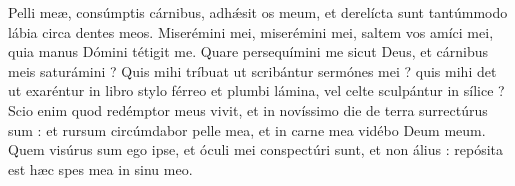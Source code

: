 \lettrine{P}{}elli meæ, consúmptis cárnibus, adhǽsit os meum, et derelícta sunt tantúmmodo lábia circa dentes meos.
Miserémini mei, miserémini mei, saltem vos amíci mei, quia manus Dómini tétigit me.
Quare persequímini me sicut Deus, et cárnibus meis saturámini ?
Quis mihi tríbuat ut scribántur sermónes mei ? quis mihi det ut exaréntur in libro
stylo férreo et plumbi lámina, vel celte sculpántur in sílice ?
Scio enim quod redémptor meus vivit, et in novíssimo die de terra surrectúrus sum :
et rursum circúmdabor pelle mea, et in carne mea vidébo Deum meum.
Quem visúrus sum ego ipse, et óculi mei conspectúri sunt, et non álius : repósita est hæc spes mea in sinu meo.